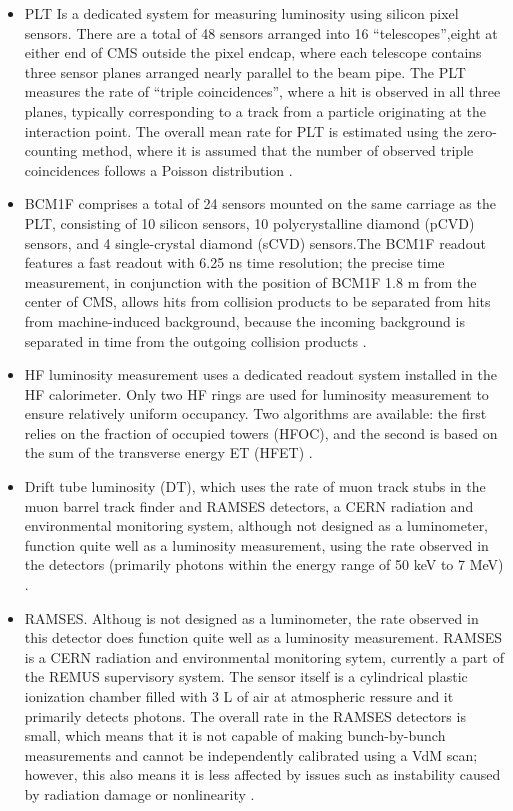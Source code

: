 \begin{itemize}

\item PLT Is a dedicated system for measuring luminosity using silicon pixel sensors. There are a total of 48 sensors arranged into 16 “telescopes”,eight at either end of CMS outside the pixel endcap, where each telescope contains three sensor planes arranged nearly parallel to the beam pipe. The PLT measures the rate of “triple coincidences”, where a hit is observed in all three planes, typically corresponding to a track from a particle originating at the interaction point. The overall mean rate for PLT  is estimated using the zero-counting method, where it is assumed that the number of observed triple coincidences follows a Poisson distribution \cite{pas_18}. 

\item BCM1F comprises a total of 24 sensors mounted on the same carriage as the PLT, consisting of 10 silicon sensors, 10 polycrystalline diamond (pCVD) sensors, and 4 single-crystal diamond (sCVD) sensors.The BCM1F readout features a fast readout with 6.25 ns time resolution; the precise time measurement, in conjunction with the position of BCM1F 1.8 m from the center of CMS, allows hits from collision products to be separated from hits from machine-induced background, because the incoming background is separated in time from the outgoing collision products  \cite{pas_18}. 

\item HF luminosity measurement uses a dedicated readout system installed in the HF calorimeter. Only two HF rings are used for luminosity measurement to ensure relatively uniform occupancy. Two algorithms are available: the first relies on the fraction of occupied towers (HFOC), and the second is based on the sum of the transverse energy ET (HFET)  \cite{pas_18}.

\item Drift tube luminosity (DT), which uses the rate of muon track stubs in the muon barrel track finder and  RAMSES detectors, a CERN radiation and environmental monitoring system, although not designed as a luminometer, function quite well as a luminosity measurement, using the rate observed in the detectors (primarily photons within the energy range of 50 keV to 7 MeV) \cite{pas_18}.

\item RAMSES. Althoug is not designed as a luminometer, the rate observed in this detector does function quite well as a luminosity measurement. RAMSES is a CERN radiation and environmental monitoring sytem, currently a part of the REMUS supervisory system. The sensor itself is a cylindrical plastic ionization chamber filled with 3 L of air at atmospheric ressure and it primarily detects photons.  The overall rate in the RAMSES detectors is small, which means that it is not capable of making bunch-by-bunch measurements and cannot be independently calibrated using a VdM scan; however, this also means it is less affected by issues such as instability caused by radiation damage or nonlinearity \cite{pas_18}.


\end{itemize}
